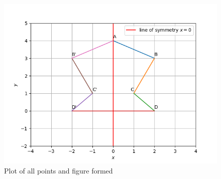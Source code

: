 \documentclass[journal,12pt,twocolumn]{IEEEtran}
\begin{document}
	\begin{figure}[h]
		\centering
		\includegraphics[scale=0.7]{./Figs/Figure_1.png}
		\caption{Plot of all points and figure formed}
	\end{figure}
\end{document}

